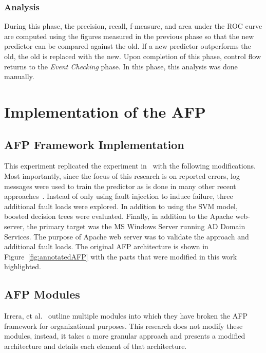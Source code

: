 
\subsubsection{Analysis}
During this phase, the precision, recall, f-measure, and area under the
\ac{ROC} curve are computed using the figures measured in the previous phase so
that the new predictor can be compared against the old.  If a new predictor
outperforms the old, the old is replaced with the new.  Upon completion of this
phase, control flow returns to the \emph{Event Checking} phase.  In this phase,
this analysis was done manually.

\section{Implementation of the \ac{AFP}} \label{sec:implementation}
\subsection{\ac{AFP} Framework Implementation}
This experiment replicated the experiment in~\cite{irrera2015} with the
following modifications.  Most importantly, since the focus of this research is
on reported errors, log messages were used to train the predictor as is done in
many other recent
approaches~\cite{domeniconi2002,fulp2008,salfner2007,watanabe2014}.  Instead of
only using fault injection to induce failure, three additional fault loads were
explored.  In addition to using the \ac{SVM} model, boosted decision trees were
evaluated.  Finally, in addition to the Apache web-server, the primary target
was the \ac{MS} Windows Server running \ac{AD} Domain Services.  The purpose of
Apache web server was to validate the approach and additional fault loads.  The
original \ac{AFP} architecture is shown in Figure~\ref{fig:annotatedAFP} with
the parts that were modified in this work highlighted.  

\subsection{\ac{AFP} Modules}
Irrera, et al.~\cite{irrera2015} outline multiple modules into which they have
broken the \ac{AFP} framework for organizational purposes.  This research does
not modify these modules, instead, it takes a more granular approach and
presents a modified architecture and details each element of that architecture.

